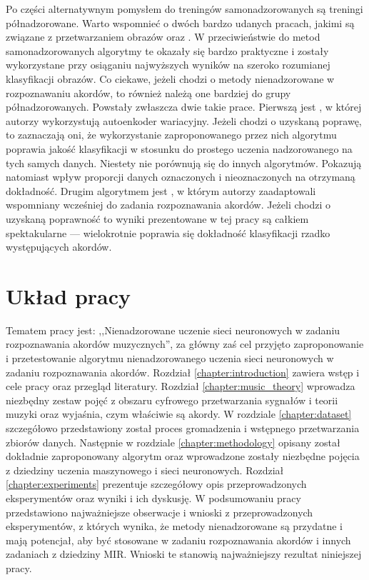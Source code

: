 Po części alternatywnym pomysłem do treningów samonadzorowanych są treningi półnadzorowane. Warto wspomnieć o dwóch bardzo udanych pracach, jakimi są związane z przetwarzaniem obrazów \cite{xie_self-training_2020} oraz \cite{pham_meta_2021}. W przeciwieństwie do metod samonadzorowanych algorytmy te okazały się bardzo praktyczne i zostały wykorzystane przy osiąganiu najwyższych wyników na szeroko rozumianej klasyfikacji obrazów. Co ciekawe, jeżeli chodzi o metody nienadzorowane w rozpoznawaniu akordów, to również należą one bardziej do grupy półnadzorowanych. Powstały zwłaszcza dwie takie prace. Pierwszą jest \cite{wu_semi-supervised_2020}, w której autorzy wykorzystują autoenkoder wariacyjny. Jeżeli chodzi o uzyskaną poprawę, to zaznaczają oni, że wykorzystanie zaproponowanego przez nich algorytmu poprawia jakość klasyfikacji w stosunku do prostego uczenia nadzorowanego na tych samych danych. Niestety nie porównują się do innych algorytmów. Pokazują natomiast wpływ proporcji danych oznaczonych i nieoznaczonych na otrzymaną dokładność. Drugim algorytmem jest \cite{bortolozzo_improving_2021}, w którym autorzy zaadaptowali wspomniany wcześniej \cite{xie_self-training_2020} do zadania rozpoznawania akordów. Jeżeli chodzi o uzyskaną poprawność to wyniki prezentowane w tej pracy są całkiem spektakularne --- wielokrotnie poprawia się dokładność klasyfikacji rzadko występujących akordów.



\section{Układ pracy}

Tematem pracy jest: ,,Nienadzorowane uczenie sieci neuronowych w zadaniu rozpoznawania akordów muzycznych'', za główny zaś cel przyjęto zaproponowanie i przetestowanie algorytmu nienadzorowanego uczenia sieci neuronowych w zadaniu rozpoznawania akordów. Rozdział \ref{chapter:introduction} zawiera wstęp i cele pracy oraz przegląd literatury. Rozdział \ref{chapter:music_theory} wprowadza niezbędny zestaw pojęć z obszaru cyfrowego przetwarzania sygnałów i teorii muzyki oraz wyjaśnia, czym właściwie są akordy. W rozdziale \ref{chapter:dataset} szczegółowo przedstawiony został proces gromadzenia i wstępnego przetwarzania zbiorów danych. Następnie w rozdziale \ref{chapter:methodology} opisany został dokładnie zaproponowany algorytm oraz wprowadzone zostały niezbędne pojęcia z dziedziny uczenia maszynowego i sieci neuronowych. Rozdział \ref{chapter:experiments} prezentuje szczegółowy opis przeprowadzonych eksperymentów oraz wyniki i ich dyskusję. W podsumowaniu pracy przedstawiono najważniejsze obserwacje i wnioski z przeprowadzonych eksperymentów, z których wynika, że metody nienadzorowane są przydatne i mają potencjał, aby być stosowane w zadaniu rozpoznawania akordów i innych zadaniach z dziedziny MIR. Wnioski te stanowią najważniejszy rezultat niniejszej pracy.
